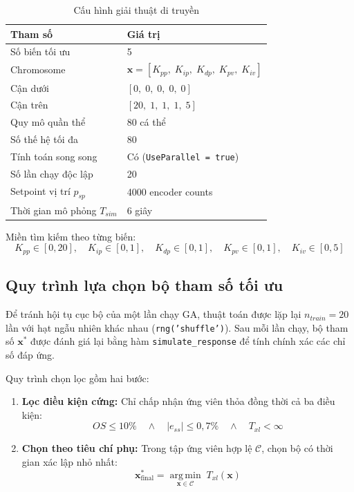 \begin{table}[H]
    \centering
    \caption{Cấu hình giải thuật di truyền}
    \label{tab:ga_config}
    \renewcommand{\arraystretch}{1.3}
    \begin{tabular}{|l|l|}
    \hline
    \textbf{Tham số} & \textbf{Giá trị} \\
    \hline
    Số biến tối ưu & 5 \\
    Chromosome & $\mathbf{x} = [K_{pp},\;K_{ip},\;K_{dp},\;K_{pv},\;K_{iv}]$ \\
    Cận dưới & $[0,\;0,\;0,\;0,\;0]$ \\
    Cận trên & $[20,\;1,\;1,\;1,\;5]$ \\
    Quy mô quần thể & 80 cá thể \\
    Số thế hệ tối đa & 80 \\
    Tính toán song song & Có (\texttt{UseParallel = true}) \\
    Số lần chạy độc lập & 20 \\
    Setpoint vị trí $p_{sp}$ & 4000 encoder counts \\
    Thời gian mô phỏng $T_{sim}$ & 6 giây \\
    \hline
    \end{tabular}
\end{table}

Miền tìm kiếm theo từng biến:
\begin{equation}
    K_{pp}\!\in[0,20],\quad K_{ip}\!\in[0,1],\quad K_{dp}\!\in[0,1],
    \quad K_{pv}\!\in[0,1],\quad K_{iv}\!\in[0,5]
    \label{eq:ga_bounds}
\end{equation}

\subsection{Quy trình lựa chọn bộ tham số tối ưu}

Để tránh hội tụ cục bộ của một lần chạy GA, thuật toán được lặp lại
$n_{train} = 20$ lần với hạt ngẫu nhiên khác nhau (\texttt{rng('shuffle')}).
Sau mỗi lần chạy, bộ tham số $\mathbf{x}^*$ được đánh giá lại bằng hàm
\texttt{simulate\_response} để tính chính xác các chỉ số đáp ứng.

Quy trình chọn lọc gồm hai bước:

\begin{enumerate}
    \item \textbf{Lọc điều kiện cứng:} Chỉ chấp nhận ứng viên thỏa đồng thời
    cả ba điều kiện:
    \begin{equation}
        OS \leq 10\%
        \quad\wedge\quad
        |e_{ss}| \leq 0{,}7\%
        \quad\wedge\quad
        T_{xl} < \infty
        \label{eq:hard_constraints}
    \end{equation}

    \item \textbf{Chọn theo tiêu chí phụ:} Trong tập ứng viên hợp lệ
    $\mathcal{C}$, chọn bộ có thời gian xác lập nhỏ nhất:
    \begin{equation}
        \mathbf{x}^*_{\text{final}}
        = \operatorname*{arg\,min}_{\mathbf{x}\in\mathcal{C}}\; T_{xl}(\mathbf{x})
        \label{eq:final_selection}
    \end{equation}
\end{enumerate}

